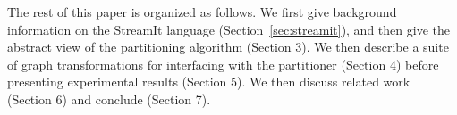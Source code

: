 The rest of this paper is organized as follows.  We first give
background information on the StreamIt language
(Section~\ref{sec:streamit}), and then give the abstract view of the
partitioning algorithm (Section 3).  We then describe a suite of graph
transformations for interfacing with the partitioner (Section 4)
before presenting experimental results (Section 5).  We then discuss
related work (Section 6) and conclude (Section 7).
